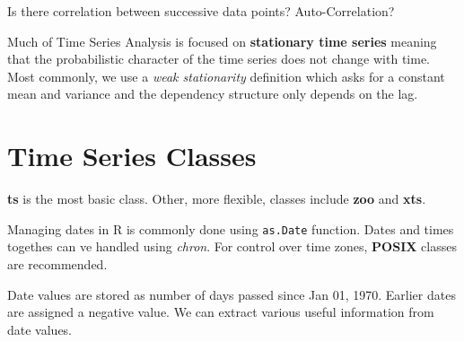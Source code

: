 \documentclass[11pt, letterpaper, twoside]{memoir}\usepackage{knitr}
\begin{document}
Is there correlation between successive data points? Auto-Correlation?

Much of Time Series Analysis is focused on \textbf{stationary time series} meaning that the probabilistic character of the time series does not change with time. Most commonly, we use a \emph{weak stationarity} definition which asks for a constant mean and variance and the dependency structure only depends on the lag.

\section{Time Series Classes}

\textbf{ts} is the most basic class. Other, more flexible, classes include \textbf{zoo} and \textbf{xts}.

Managing dates in R is commonly done using \texttt{as.Date} function. Dates and times togethes can ve handled using \emph{chron}. For control over time zones, \textbf{POSIX} classes are recommended.

\begin{knitrout}
\color{fgcolor}
\end{knitrout}

Date values are stored as number of days passed since Jan 01, 1970. Earlier dates are assigned a negative value. We can extract various useful information from date values.
\end{document}

